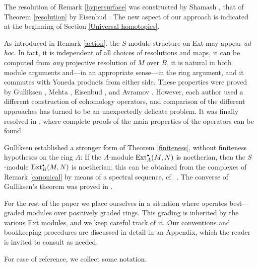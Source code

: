 \begin{Remark}
\label{history}
The resolution of Remark \ref{hypersurface} was constructed by Shamash
\cite[Sect.\ 3]{CI:Sh}, that of Theorem \ref{resolution} by Eisenbud
\cite[Sect.\ 7]{CI:Ei}.  The new aspect of our approach is indicated at
the beginning of Section \ref{Universal homotopies}.

As introduced in Remark \ref{action}, the $S$-module structure on Ext
may appear {\sl ad hoc\/}.  In fact, it is independent of all choices
of resolutions and maps, it can be computed from {\it any\/} projective
resolution of $M$ over $B$, it is natural in both module arguments
and---in an appropriate sense---in the ring argument, and it commutes
with Yoneda products from either side.  These properties were proved by
Gulliksen \cite[Sect.~2]{CI:MR51:487}, Mehta \cite[Ch.~2]{CI:Me},
Eisenbud \cite[Sect.\ 4]{CI:Ei}, and Avramov
\cite[Sect.\ 2]{CI:MR90g:13027}.  However, each author used a different
construction of cohomology operators, and comparison of the
different approaches has turned to be an unexpectedly delicate
problem.  It was finally resolved in \cite{CI:MR2000e:13021}, where
complete proofs of the main properties of the operators can be found.

Gulliksen \cite[Sect.~3]{CI:MR51:487} established a stronger form of
Theorem \ref{finiteness}, without finiteness hypotheses on the ring
$A$: If the $A$-module $\operatorname{Ext}^{\scriptscriptstyle\bullet}_A(M,N)$ is noetherian, then the
$S$-module $\operatorname{Ext}^{\scriptscriptstyle\bullet}_B(M,N)$ is noetherian; this can be obtained from
the complexes of Remark \eqref{canonical} by means of a spectral
sequence, cf.\ \cite[Sect.~6]{CI:MR1774757}.  The converse of
Gulliksen's theorem was proved in \cite[Sect.~4]{CI:MR99c:13033}.
 \end{Remark}

For the rest of the paper we place ourselves in a situation where \Mtwo
operates best---graded modules over positively graded rings.  This
grading is inherited by the various Ext modules, and we keep careful
track of it.  Our conventions and bookkeeping procedures are discussed
in detail in an Appendix, which the reader is invited to consult as
needed.

For ease of reference, we collect some notation.

